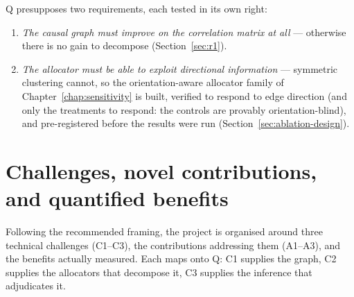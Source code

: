\noindent Q presupposes two requirements, each tested in its own right:
\begin{enumerate}[label=\textbf{R\arabic*}, itemsep=1pt, topsep=3pt]
  \item \emph{The causal graph must improve on the correlation matrix at all}
    --- otherwise there is no gain to decompose
    (Section~\ref{sec:r1}).
  \item \emph{The allocator must be able to exploit directional information}
    --- symmetric clustering cannot, so the orientation-aware allocator
    family of Chapter~\ref{chap:sensitivity} is built, verified to respond to
    edge direction (and only the treatments to respond: the controls are
    provably orientation-blind), and pre-registered before the results were
    run (Section~\ref{sec:ablation-design}).
\end{enumerate}

\section{Challenges, novel contributions, and quantified benefits}
\label{sec:challenges}

Following the recommended framing, the project is organised around three
technical challenges (C1--C3), the contributions addressing them (A1--A3),
and the benefits actually measured. Each maps onto Q: C1 supplies the graph,
C2 supplies the allocators that decompose it, C3 supplies the inference that
adjudicates it.

